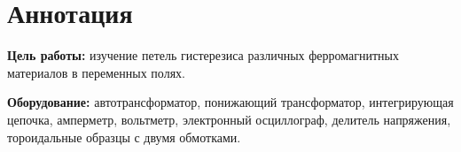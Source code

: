 \section{Аннотация}
\textbf{Цель работы:}
изучение петель гистерезиса различных ферромагнитных материалов в переменных полях.

\textbf{Оборудование:}
автотрансформатор, понижающий трансформатор, интегрирующая цепочка, амперметр, вольтметр, электронный осциллограф, делитель напряжения, тороидальные образцы с двумя обмотками.
